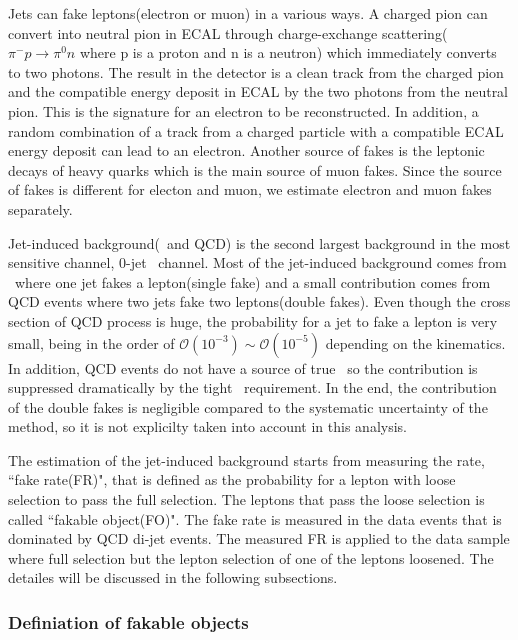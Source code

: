 Jets can fake leptons(electron or muon) in a various ways.
A charged pion can convert into neutral pion in ECAL through 
charge-exchange scattering($\pi^-p\rightarrow \pi^0n$ where p is a proton and n is a neutron) 
which immediately converts to two photons. The result in the detector is 
a clean track from the charged pion and the compatible energy deposit in ECAL by the two 
photons from the neutral pion. This is the signature for an electron to be 
reconstructed. In addition, a random combination of a track from a charged 
particle with a compatible ECAL energy deposit can lead to an electron.  
Another source of fakes is the leptonic decays of heavy quarks
which is the main source of muon fakes. Since the source of fakes 
is different for electon and muon, we estimate electron and muon fakes 
separately. 

Jet-induced background(\Wjets\ and QCD) is the second largest background in the most 
sensitive channel, 0-jet \DF\ channel. 
Most of the jet-induced background comes from \Wjets\ where one jet fakes a lepton(single fake)
and a small contribution comes from QCD events where two jets fake two leptons(double fakes).  
Even though the cross section of QCD process is huge, the probability for a jet 
to fake a lepton is very small, being in the order of 
$\mathcal{O}(10^{-3}) \sim \mathcal{O}(10^{-5})$
depending on the kinematics. In addition, QCD events do not have a source of true \met\, 
so the contribution is suppressed dramatically by the tight \met\ requirement. 
In the end, the contribution of the double fakes is negligible compared to the 
systematic uncertainty of the method, so it is not explicilty taken into account in this analysis. 

The estimation of the jet-induced background starts from measuring the rate, ``fake rate(FR)",
that is defined as the probability for a lepton with loose selection to pass the full selection. 
The leptons that pass the loose selection is called ``fakable object(FO)". The fake rate is 
measured in the data events that is dominated by QCD di-jet events. 
The measured FR is applied to the data sample where full selection but the lepton selection 
of one of the leptons loosened. The detailes will be discussed in the following subsections.

\subsubsection{Definiation of fakable objects}

